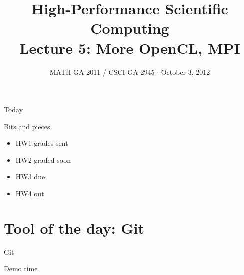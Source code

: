\documentclass[english,compress]{beamer}
\begin{document}

\title{High-Performance Scientific Computing\\Lecture 5: More OpenCL, MPI}

\date{MATH-GA 2011 / CSCI-GA 2945 $\cdot$ October 3, 2012}

\frame{\titlepage}

\begin{frame}{Today}
  \tableofcontents[hideallsubsections]
\end{frame}
\begin{frame}{Bits and pieces}
  \begin{itemize}
    \item HW1 grades sent
    \item HW2 graded soon
    \item HW3 due
    \item HW4 out
  \end{itemize}
\end{frame}
\section{Tool of the day: Git}
\begin{frame}{Git}
  \begin{center}
  \Huge Demo time
  \end{center}
\end{frame}
\end{document}
